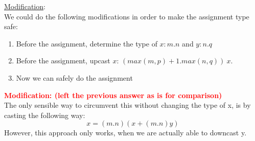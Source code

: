 \underline{Modification}:\\
We could do the following modifications in order to make the assignment type safe:
\begin{enumerate}
  \item Before the assignment, determine the type of $x: m.n$ and $y: n.q$
  \item Before the assignment, upcast $x$: $(max(m,p)+1.max(n,q))\ x$.
  \item Now we can safely do the assignment
\end{enumerate}
\textcolor{red}{\textbf{Modification: (left the previous answer as is for comparison)}}\\
The only sensible way to circumvent this without changing the type of x, is by casting the following way:
$$
x = (m.n)(x + (m.n)y)
$$
However, this approach only works, when we are actually able to downcast y.
